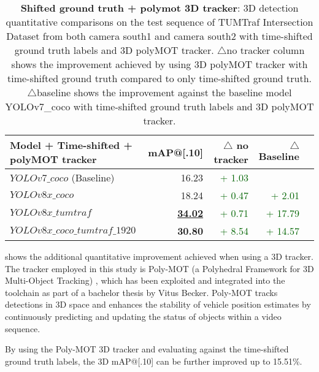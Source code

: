 \begin{table}[htb]%
	\centering
	\begin{tabular}[htb]{lrrrr}
		\toprule
		\textbf{Model + Time-shifted + polyMOT tracker} & \textbf{mAP@[.10]} & \textbf{$\triangle$ no tracker}& \textbf{$\triangle$Baseline} \\
		\midrule
		$YOLOv7\_coco$ (Baseline) & 16.23 & \textcolor{darkgreen}{+ 1.03} & \\
		$YOLOv8x\_coco$& 18.24 & \textcolor{darkgreen}{+ 0.47} & \textcolor{darkgreen}{+ 2.01}  \\
		$YOLOv8x\_tumtraf$ & \underline{\textbf{34.02}} & \textcolor{darkgreen}{+ 0.71} & \textcolor{darkgreen}{+ 17.79}\\
		$YOLOv8x\_coco\_tumtraf\_1920$ & \textbf{30.80} & \textcolor{darkgreen}{+ 8.54} & \textcolor{darkgreen}{+ 14.57}\\
		\midrule
	\end{tabular}
	\caption{\textbf{Shifted ground truth +  polymot 3D tracker}: 3D detection quantitative comparisons on the test sequence of TUMTraf Intersection Dataset from both camera south1 and camera south2 with time-shifted ground truth labels and 3D polyMOT tracker. $\triangle$no tracker column shows the improvement achieved by using 3D polyMOT tracker with time-shifted ground truth compared to only time-shifted ground truth. $\triangle$baseline shows the improvement against the baseline model YOLOv7\_coco with time-shifted ground truth labels and 3D polyMOT tracker.}
	\label{tab:polymot_3d_tracker}
\end{table}

 shows the additional quantitative improvement achieved when using a 3D tracker. The tracker employed in this study is Poly-MOT (a Polyhedral Framework for 3D Multi-Object Tracking) \cite{polymot}, which has been exploited and integrated into the toolchain as part of a bachelor thesis by Vitus Becker. Poly-MOT tracks detections in 3D space and enhances the stability of vehicle position estimates by continuously predicting and updating the status of objects within a video sequence. 

By using the Poly-MOT 3D tracker and evaluating against the time-shifted ground truth labels, the 3D mAP@[.10] can be further improved up to 15.51\%.